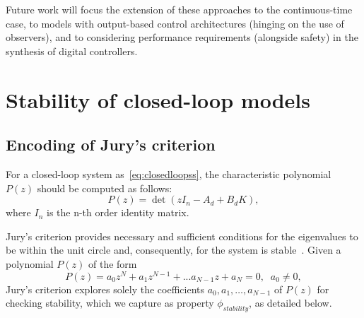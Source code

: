 \documentclass[runningheads,a4paper]{llncs}
\newcommand{\addtodo}[1]{{\color{red} TODO: #1}}
\begin{document}
Future work will focus the extension of these approaches to the
continuous-time case, to models with output-based control architectures
(hinging on the use of observers), and to considering performance
requirements (alongside safety) in the synthesis of digital controllers.

\newpage


  

\newpage
\appendix
\section{Stability of closed-loop models}
\label{sec:appendix-stability}


\subsection{Encoding of Jury's criterion}

For a closed-loop system as~\eqref{eq:closedloopss}, 
the characteristic polynomial $P(z)$ should be computed as follows:
\begin{equation}
P(z)= \det( z I_{n} - A_d + B_d K ),
\end{equation}
where $I_{n}$ is the n-th order identity matrix. 

Jury's criterion provides necessary and sufficient conditions for the
eigenvalues to be within the unit circle and, consequently, for the system
is stable~\cite{fadali}.  Given a polynomial $P(z)$ of the form
%
$$
P(z) = a_{0}z^{N} + a_{1}z^{N-1} + ... a_{N-1}z + a_{N} = 0, \;\; a_{0}\neq 0,
$$
%
Jury's criterion explores solely the coefficients
$a_{0},a_{1},\ldots,a_{N-1}$ of $P(z)$ for checking stability, which we
capture as property $\phi_{stability}$, as detailed below.
\end{document}
